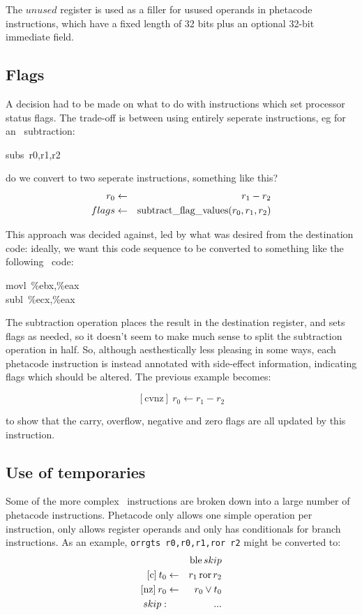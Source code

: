 The $unused$ register is used as a filler for usused operands in phetacode instructions, which have a fixed length of 32 bits plus an optional 32-bit immediate field.

\subsection{Flags}

A decision had to be made on what to do with instructions which set processor status flags. The trade-off is between using entirely seperate instructions, eg for an \arm\ subtraction:

\begin{code}
subs~r0,r1,r2
\end{code}

do we convert to two seperate instructions, something like this?
\begin{eqnarray*}
r_{0} & \leftarrow & r_{1} - r_{2} \\
flags & \leftarrow & \mathop{\rm subtract\_flag\_values}(r_0,r_1,r_2)
\end{eqnarray*}

This approach was decided against, led by what was desired from the destination code: ideally, we want this code sequence to be converted to something like the following \ia\ code:

\begin{code}
movl~\%ebx,\%eax\\
subl~\%ecx,\%eax
\end{code}

The subtraction operation places the result in the destination register, and sets flags as needed, so it doesn't seem to make much sense to split the subtraction operation in half. So, although aesthestically less pleasing in some ways, each phetacode instruction is instead annotated with side-effect information, indicating flags which should be altered. The previous example becomes:

\[\mathrm{[cvnz]}\: r_0 \leftarrow r_1 - r_2 \]

to show that the carry, overflow, negative and zero flags are all updated by this instruction.

\subsection{Use of temporaries}

Some of the more complex \arm\ instructions are broken down into a large number of phetacode instructions. Phetacode only allows one simple operation per instruction, only allows register operands and only has conditionals for branch instructions. As an example, {\tt orrgts r0,r0,r1,ror r2} might be converted to:
\begin{eqnarray*}
 & & \mathop{\rm ble} skip\\
\mathrm{[c]}\: t_{0} & \leftarrow & r_1 \mathop{\rm ror} r_2\\
\mathrm{[nz]}\: r_{0} & \leftarrow & r_0 \vee t_0\\
skip: & & ...
\end{eqnarray*}

